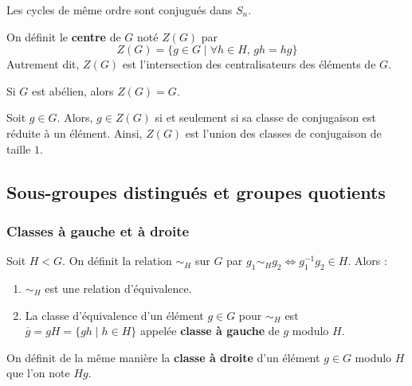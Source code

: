  \begin{example}
    Les cycles de même ordre sont conjugués dans $S_n$.
  \end{example}


  \begin{definition}
    On définit le \textbf{centre} de $G$ noté $Z(G)$ par
    \[ Z(G) = \{ g \in G \mid \forall h \in H, \, gh=hg \} \]
    Autrement dit, $Z(G)$ est l'intersection des centralisateurs des éléments de $G$.
  \end{definition}

  \begin{example}
    Si $G$ est abélien, alors $Z(G) = G$.
  \end{example}


  \begin{proposition}
    Soit $g \in G$. Alors, $g \in Z(G)$ si et seulement si sa classe de conjugaison est réduite à un élément.
    \newpar
    Ainsi, $Z(G)$ est l'union des classes de conjugaison de taille $1$.
  \end{proposition}

  \subsection{Sous-groupes distingués et groupes quotients}

  \subsubsection{Classes à gauche et à droite}


  \begin{proposition}
    \label{103-1}
    Soit $H < G$. On définit la relation $\sim_H$ sur $G$ par $g_1 \sim_H g_2 \iff g_1^{-1} g_2 \in H$. Alors :
    \begin{enumerate}[label=(\roman*)]
      \item $\sim_H$ est une relation d'équivalence.
      \item La classe d'équivalence d'un élément $g \in G$ pour $\sim_H$ est $\overline{g} = gH = \{ gh \mid h \in H \}$ appelée \textbf{classe à gauche} de $g$ modulo $H$.
    \end{enumerate}
  \end{proposition}

  \begin{remark}
    On définit de la même manière la \textbf{classe à droite} d'un élément $g \in G$ modulo $H$ que l'on note $Hg$.
  \end{remark}

